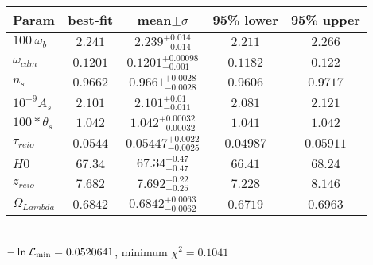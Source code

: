 \begin{tabular}{|l|c|c|c|c|} 
 \hline 
Param & best-fit & mean$\pm\sigma$ & 95\% lower & 95\% upper \\ \hline 
$100~\omega{}_{b }$ &$2.241$ & $2.239_{-0.014}^{+0.014}$ & $2.211$ & $2.266$ \\ 
$\omega{}_{cdm }$ &$0.1201$ & $0.1201_{-0.001}^{+0.00098}$ & $0.1182$ & $0.122$ \\ 
$n_{s }$ &$0.9662$ & $0.9661_{-0.0028}^{+0.0028}$ & $0.9606$ & $0.9717$ \\ 
$10^{+9}A_{s }$ &$2.101$ & $2.101_{-0.011}^{+0.01}$ & $2.081$ & $2.121$ \\ 
$100*\theta{}_{s }$ &$1.042$ & $1.042_{-0.00032}^{+0.00032}$ & $1.041$ & $1.042$ \\ 
$\tau{}_{reio }$ &$0.0544$ & $0.05447_{-0.0025}^{+0.0022}$ & $0.04987$ & $0.05911$ \\ 
$H0$ &$67.34$ & $67.34_{-0.47}^{+0.47}$ & $66.41$ & $68.24$ \\ 
$z_{reio }$ &$7.682$ & $7.692_{-0.25}^{+0.22}$ & $7.228$ & $8.146$ \\ 
$\Omega{}_{Lambda }$ &$0.6842$ & $0.6842_{-0.0062}^{+0.0063}$ & $0.6719$ & $0.6963$ \\ 
\hline 
 \end{tabular} \\ 
$-\ln{\cal L}_\mathrm{min} =0.0520641$, minimum $\chi^2=0.1041$ \\ 

